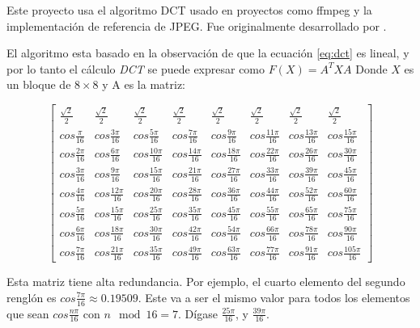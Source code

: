 {Este proyecto usa el algoritmo \gls{DCT} usado en proyectos como ffmpeg y la
implementación de referencia de JPEG. Fue originalmente desarrollado por
\cite{ahmed_dct}.

El algoritmo esta basado en la observación de que la ecuación \ref{eq:dct} es
lineal, y por lo tanto el cálculo \emph{DCT} se puede expresar como $F(X) =
A^{T}XA$ Donde $X$ es un bloque de $8\times8$ y A es la matriz:

\begin{equation}
    \label{eq:dct-matrix}
    \begin{bmatrix}
        \frac{\sqrt{2}}{2} & \frac{\sqrt{2}}{2} & \frac{\sqrt{2}}{2} & \frac{\sqrt{2}}{2} & \frac{\sqrt{2}}{2} & \frac{\sqrt{2}}{2} & \frac{\sqrt{2}}{2} & \frac{\sqrt{2}}{2} \\
        cos\frac{\pi}{16} & cos\frac{3\pi}{16}& cos\frac{5\pi}{16}& cos\frac{7\pi}{16}& cos\frac{9\pi}{16}& cos\frac{11\pi}{16}& cos\frac{13\pi}{16}& cos\frac{15\pi}{16} \\
        cos\frac{2\pi}{16} & cos\frac{6\pi}{16}& cos\frac{10\pi}{16}& cos\frac{14\pi}{16}& cos\frac{18\pi}{16}& cos\frac{22\pi}{16}& cos\frac{26\pi}{16}& cos\frac{30\pi}{16} \\
        cos\frac{3\pi}{16} & cos\frac{9\pi}{16}& cos\frac{15\pi}{16}& cos\frac{21\pi}{16}& cos\frac{27\pi}{16}& cos\frac{33\pi}{16}& cos\frac{39\pi}{16}& cos\frac{45\pi}{16} \\
        cos\frac{4\pi}{16} & cos\frac{12\pi}{16}& cos\frac{20\pi}{16}& cos\frac{28\pi}{16}& cos\frac{36\pi}{16}& cos\frac{44\pi}{16}& cos\frac{52\pi}{16}& cos\frac{60\pi}{16} \\
        cos\frac{5\pi}{16} & cos\frac{15\pi}{16}& cos\frac{25\pi}{16}& cos\frac{35\pi}{16}& cos\frac{45\pi}{16}& cos\frac{55\pi}{16}& cos\frac{65\pi}{16}& cos\frac{75\pi}{16} \\
        cos\frac{6\pi}{16} & cos\frac{18\pi}{16}& cos\frac{30\pi}{16}& cos\frac{42\pi}{16}& cos\frac{54\pi}{16}& cos\frac{66\pi}{16}& cos\frac{78\pi}{16}& cos\frac{90\pi}{16} \\
        cos\frac{7\pi}{16} & cos\frac{21\pi}{16}& cos\frac{35\pi}{16}& cos\frac{49\pi}{16}& cos\frac{63\pi}{16}& cos\frac{77\pi}{16}& cos\frac{91\pi}{16}& cos\frac{105\pi}{16}
    \end{bmatrix}
\end{equation}

Esta matriz tiene alta redundancia. Por ejemplo, el cuarto elemento del segundo renglón es $cos\frac{7\pi}{16} \approx 0.19509$. Este va a ser el mismo valor para todos los elementos que sean $cos\frac{n\pi}{16}$ con $n \mod 16 = 7$. Dígase $\frac{25\pi}{16}$, y $\frac{39\pi}{16}$.

}
